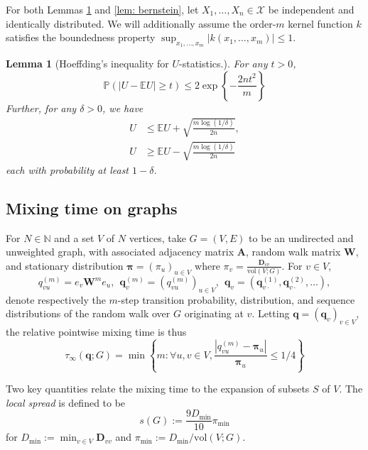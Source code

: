 \documentclass{article}
\newcommand{\set}[1]{\left\{#1\right\}}
\newcommand{\vol}{\mathrm{vol}}
\newcommand{\abs}[1]{\left \lvert #1 \right \rvert}
\newcommand{\1}{\mathbf{1}}
\newcommand{\qbf}{\mathbf{q}}
\newcommand{\pibf}{\bm{\pi}}
\newcommand{\Abf}{\mathbf{A}}
\newcommand{\Wbf}{\mathbf{W}}
\newcommand{\Dbf}{\mathbf{D}}
\theoremstyle{aldenthm}
\newtheorem{lemma}{Lemma}
\begin{document}
For both Lemmas \ref{lem: bounded_difference} and \ref{lem: bernstein}, let $X_1, \ldots, X_n \in \mathcal{X}$ be independent and identically distributed. We will additionally assume the order-$m$ kernel function $k$ satisfies the boundedness property $\sup_{x_1, \ldots, x_m} \abs{k(x_1, \ldots, x_m)} \leq 1$. 

\begin{lemma}[Hoeffding's inequality for $U$-statistics.]
	\label{lem: bounded_difference}
	For any $t > 0$,
	\begin{equation*}
	\mathbb{P}(\abs{U - \mathbb{E}U} \geq t) \leq 2 \exp\left\{- \frac{2nt^2}{m}\right\}
	\end{equation*}
	Further, for any $\delta > 0$, we have
	\begin{align*}
	U & \leq \mathbb{E}U + \sqrt{\frac{m \log(1 / \delta)}{2n} }, \\
	U & \geq \mathbb{E}U - \sqrt{\frac{m \log(1 / \delta)}{2n} }
	\end{align*}
	each with probability at least $1 - \delta$. 
\end{lemma}

\subsection{Mixing time on graphs}
For $N \in \mathbb{N}$ and a set $V$ of $N$ vertices, take $G = (V,E)$ to be an undirected and unweighted graph, with associated adjacency matrix $\Abf$, random walk matrix $\Wbf$, and stationary distribution $\pibf = (\pi_u)_{u \in V}$ where $\pi_v = \frac{\Dbf_{vv}}{\vol(V; G)}$. For $v \in V$, 
\begin{equation}
\label{eqn: random_walk}
q_{vu}^{(m)} = e_v\Wbf^m e_u, ~~ \qbf_{v}^{(m)} = \left(q_{vu}^{(m)}\right)_{u \in V}, ~~ \qbf_v = (\qbf^{(1)}_{v\cdot},\qbf^{(2)}_{v\cdot}, \ldots), 
\end{equation}
denote respectively the $m$-step transition probability, distribution, and sequence distributions of the random walk over $G$ originating at $v$. Letting $\qbf = (\qbf_v)_{v \in V}$, the relative pointwise mixing time is thus
\begin{equation*}
\tau_{\infty}(\qbf; G) = \min\set{m: \forall u,v \in V, \frac{\abs{q_{vu}^{(m)} - \pibf_u}}{\pibf_u} \leq 1/4} 
\end{equation*}

Two key quantities relate the mixing time to the expansion of subsets $S$ of $V$. The \emph{local spread} is defined to be
\begin{equation*}
s(G) := \frac{9D_{\min}}{10}\pi_{\min} 
\end{equation*}
for $D_{\min} := \min_{v \in V} \Dbf_{vv}$ and $\pi_{\min} := D_{\min} / \vol(V; G)$.
\end{document}
